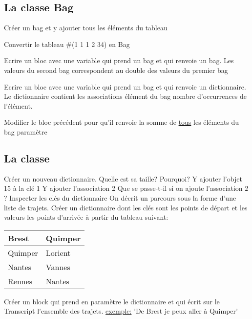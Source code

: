\subsection{La classe Bag}
\begin{itemize}
\exoitem Cr\'eer un bag et y ajouter tous les \'el\'ements du tableau 

\exoitem Convertir le tableau \#(1 1 1 2 34) en Bag

\exoitem Ecrire un bloc avec une variable qui prend un bag et qui renvoie un bag.
Les valeurs du second bag correspondent au double des valeurs du premier bag

\exoitem Ecrire un bloc avec une variable qui prend un bag et qui renvoie un dictionnaire.
Le dictionnaire contient les associations \'el\'ement du bag \assoc nombre d'occurrences de l'\'el\'ement. 

\exoitem Modifier le bloc pr\'ec\'edent pour qu'il renvoie la somme de \underline{tous} les \'el\'ements du bag param\`etre
\end{itemize}

\subsection{La classe }

\begin{itemize}
\exoitem Cr\'eer un nouveau dictionnaire. Quelle est sa taille? Pourquoi?
\exoitem Y ajouter l'objet 15 \`a la cl\'e 1
\exoitem Y ajouter l'association 2 
\exoitem Que se passe-t-il si on ajoute l'association 2 ?
\exoitem Inspecter les cl\'es du dictionnaire
\exoitem On d\'ecrit un parcours sous la forme d'une liste de trajets. Cr\'eer un dictionnaire dont
les cl\'es sont les points de d\'epart et les valeurs les points d'arriv\'ee \`a partir du tableau suivant:

\begin{tabular}{|l|l|}
\hline
Brest	&Quimper \\
\hline
Quimper	&Lorient \\
\hline
Nantes  &Vannes \\
\hline
Rennes	&Nantes \\
\hline
\end{tabular}
 
\exoitem Cr\'eer un block qui prend en param\`etre le dictionnaire et qui \'ecrit sur le Transcript l'ensemble des trajets. \underline{exemple:} 'De Brest je peux aller \`a Quimper'

\end{itemize}



\ifx\wholebook\relax\else\fi
